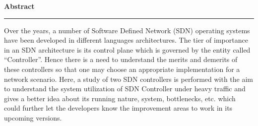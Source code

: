 \setlength{\headsep}{0.4in}
\vspace*{5cm}
\begin{center}

{\bf \LARGE Abstract}

\end{center}

{\noindent \rule{\linewidth}{1mm}} \vspace{0.25in}

\par
Over the years, a number of Software Defined Network (SDN) operating systems have been developed in different languages architectures. The tier of importance in an SDN architecture is its control plane which is governed by the entity called ``Controller''. Hence there is a need to understand the merits and demerits of these controllers so that one may choose an appropriate implementation for a network scenario. Here, a study of two SDN controllers is performed with the aim to understand the system utilization of SDN Controller under heavy traffic and gives a better idea about its running nature, system, bottlenecks, etc. which could further let the developers know the improvement areas to work in its upcoming versions.
\vspace*{\fill}
\pagebreak